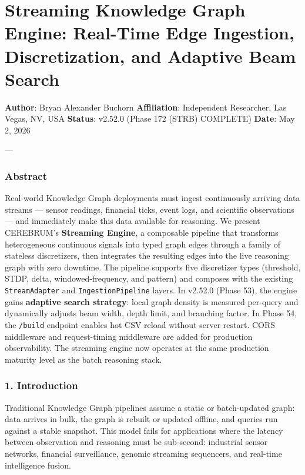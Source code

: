 \section{Streaming Knowledge Graph Engine: Real-Time Edge Ingestion, Discre\-tization, and Adaptive Beam Search}

\textbf{Author}: Bryan Alexander Buchorn  
\textbf{Affiliation}: Independent Researcher, Las Vegas, NV, USA  
\textbf{Status}: v2.52.0 (Phase 172 (STRB) COMPLETE)
\textbf{Date}: May 2, 2026

---

\subsubsection{Abstract}
Real-world Knowledge Graph deployments must ingest conti\-nuously arriving data streams — sensor readings, financial ticks, event logs, and scientific obser\-vations — and immediately make this data available for reasoning. We present CEREBRUM's \textbf{Streaming Engine}, a composable pipeline that transforms heter\-ogeneous continuous signals into typed graph edges through a family of stateless discr\-etizers, then integrates the resulting edges into the live reasoning graph with zero downtime. The pipeline supports five discretizer types (threshold, STDP, delta, windowed-frequency, and pattern) and composes with the existing \texttt{StreamAdapter} and \texttt{IngestionPipeline} layers. In v2.52.0 (Phase 53), the engine gains \textbf{adaptive search strategy}: local graph density is measured per-query and dynamically adjusts beam width, depth limit, and branching factor. In Phase 54, the \texttt{/build} endpoint enables hot CSV reload without server restart. CORS middleware and request-timing middleware are added for production obser\-vability. The streaming engine now operates at the same production maturity level as the batch reasoning stack.

\subsubsection{1. Introd\-uction}
Traditional Knowledge Graph pipelines assume a static or batch-updated graph: data arrives in bulk, the graph is rebuilt or updated offline, and queries run against a stable snapshot. This model fails for appli\-cations where the latency between observation and reasoning must be sub-second: industrial sensor networks, financial surve\-illance, genomic streaming sequencers, and real-time intel\-ligence fusion.

